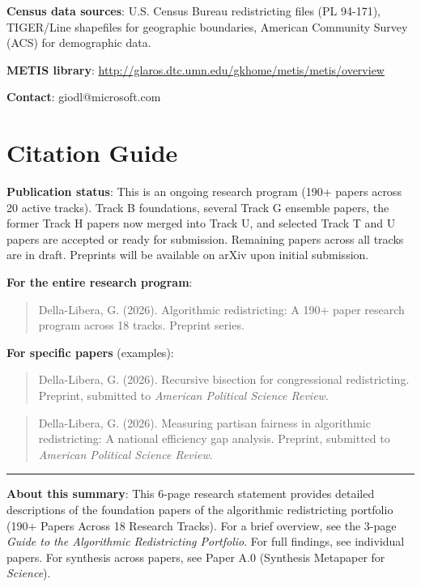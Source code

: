 \documentclass[11pt]{article}
\begin{document}
\textbf{Census data sources}: U.S. Census Bureau redistricting files (PL 94-171), TIGER/Line shapefiles for geographic boundaries, American Community Survey (ACS) for demographic data.

\textbf{METIS library}: \url{http://glaros.dtc.umn.edu/gkhome/metis/metis/overview}

\textbf{Contact}: giodl@microsoft.com

\section*{Citation Guide}

\textbf{Publication status}: This is an ongoing research program (190+ papers across 20 active tracks). Track B foundations, several Track G ensemble papers, the former Track H papers now merged into Track U, and selected Track T and U papers are accepted or ready for submission. Remaining papers across all tracks are in draft. Preprints will be available on arXiv upon initial submission.

\textbf{For the entire research program}:

\begin{quote}
Della-Libera, G. (2026). Algorithmic redistricting: A 190+ paper research program across 18 tracks. Preprint series.
\end{quote}

\textbf{For specific papers} (examples):

\begin{quote}
Della-Libera, G. (2026). Recursive bisection for congressional redistricting. Preprint, submitted to \emph{American Political Science Review}.
\end{quote}

\begin{quote}
Della-Libera, G. (2026). Measuring partisan fairness in algorithmic redistricting: A national efficiency gap analysis. Preprint, submitted to \emph{American Political Science Review}.
\end{quote}

\vspace{12pt}

\noindent\rule{\textwidth}{0.4pt}

\vspace{6pt}

\noindent\textbf{About this summary}: This 6-page research statement provides detailed descriptions of the foundation papers of the algorithmic redistricting portfolio (190+ Papers Across 18 Research Tracks). For a brief overview, see the 3-page \emph{Guide to the Algorithmic Redistricting Portfolio}. For full findings, see individual papers. For synthesis across papers, see Paper A.0 (Synthesis Metapaper for \emph{Science}).
\end{document}
